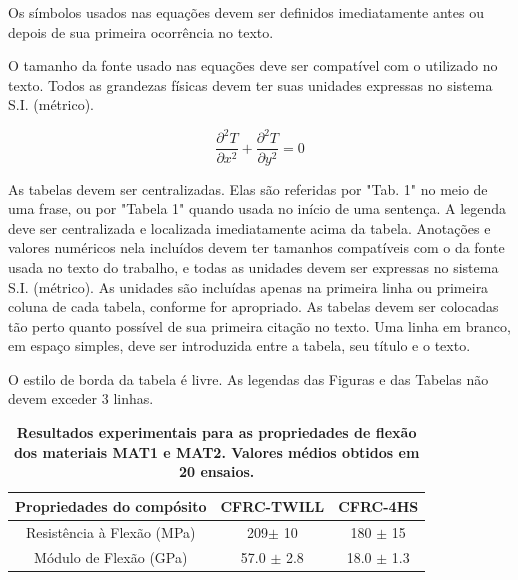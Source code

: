 \documentclass[10pt,fleqn,a4paper]{article}
\begin{document}
        Os símbolos usados nas equações devem ser definidos imediatamente antes ou depois de sua primeira ocorrência no texto. \citep{artigoMangaSBAI}

        O tamanho da fonte usado nas equações deve ser compatível com o utilizado no texto. Todos as grandezas físicas devem ter suas unidades expressas no sistema S.I. (métrico).

        \begin{equation}
        \frac{\partial^2 T}{\partial x^2} + \frac{\partial^2 T}{\partial y^2} = 0 \label{equation1}
        \end{equation}

        As tabelas devem ser centralizadas. Elas são referidas por "Tab. 1" no meio de uma frase, ou por "Tabela 1" quando usada no início de uma sentença. A legenda deve ser centralizada e localizada imediatamente acima da tabela. Anotações e valores numéricos nela incluídos devem ter tamanhos compatíveis com o da fonte usada no texto do trabalho, e todas as unidades devem ser expressas no sistema S.I. (métrico). As unidades são incluídas apenas na primeira linha ou primeira coluna de cada tabela, conforme for apropriado. As tabelas devem ser colocadas tão perto quanto possível de sua primeira citação no texto. Uma linha em branco, em espaço simples, deve ser introduzida entre a tabela, seu título e o texto.

        O estilo de borda da tabela é livre. As legendas das Figuras e das Tabelas não devem exceder 3 linhas.

        \begin{table}[ht]
            \begin{center}
                \caption{\textbf{Resultados experimentais para as propriedades de flexão dos materiais MAT1 e MAT2. Valores médios obtidos em 20 ensaios.}}
                    \begin{tabular}{|c|c|c|}
                    \hline
                    Propriedades do compósito       & CFRC-TWILL        & CFRC-4HS         \\
                    \hline
                    Resistência à Flexão  (MPa)     & 209$\pm$ 10       & 180 $\pm$  15    \\
                    \hline
                    Módulo de Flexão  (GPa)         & 57.0 $\pm$ 2.8    & 18.0 $\pm$  1.3  \\
                    \hline
                    \end{tabular}
            \end{center}
        \end{table}
\end{document}
